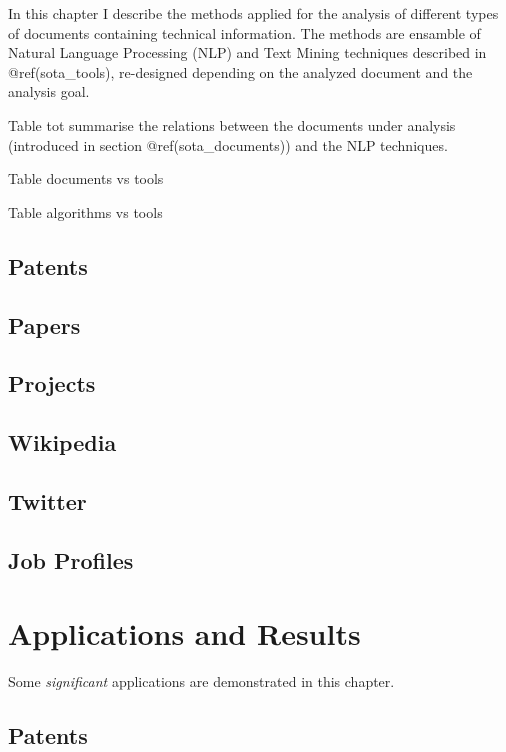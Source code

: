 \documentclass[]{book}
\theoremstyle{definition}
\theoremstyle{definition}
\theoremstyle{definition}
\theoremstyle{remark}
\begin{document}
In this chapter I describe the methods applied for the analysis of
different types of documents containing technical information. The
methods are ensamble of Natural Language Processing (NLP) and Text
Mining techniques described in @ref(sota\_tools), re-designed depending
on the analyzed document and the analysis goal.

Table tot summarise the relations between the documents under analysis
(introduced in section @ref(sota\_documents)) and the NLP techniques.

Table documents vs tools

Table algorithms vs tools

\section{Patents}\label{patents}

\section{Papers}\label{papers}

\section{Projects}\label{projects}

\section{Wikipedia}\label{wikipedia}

\section{Twitter}\label{twitter}

\section{Job Profiles}\label{job-profiles}

\chapter{Applications and Results}\label{applications-and-results}

Some \emph{significant} applications are demonstrated in this chapter.

\section{Patents}\label{patents-1}
\end{document}
